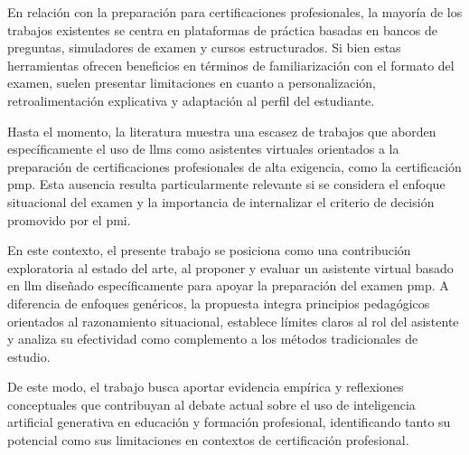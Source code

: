 En relación con la preparación para certificaciones profesionales, la mayoría de los trabajos existentes se centra en plataformas de práctica basadas en bancos de preguntas, simuladores de examen y cursos estructurados. Si bien estas herramientas ofrecen beneficios en términos de familiarización con el formato del examen, suelen presentar limitaciones en cuanto a personalización, retroalimentación explicativa y adaptación al perfil del estudiante.

Hasta el momento, la literatura muestra una escasez de trabajos que aborden específicamente el uso de \glspl{llm} como asistentes virtuales orientados a la preparación de certificaciones profesionales de alta exigencia, como la certificación \gls{pmp}. Esta ausencia resulta particularmente relevante si se considera el enfoque situacional del examen y la importancia de internalizar el criterio de decisión promovido por el \gls{pmi}.

En este contexto, el presente trabajo se posiciona como una contribución exploratoria al estado del arte, al proponer y evaluar un asistente virtual basado en \gls{llm} diseñado específicamente para apoyar la preparación del examen \gls{pmp}. A diferencia de enfoques genéricos, la propuesta integra principios pedagógicos orientados al razonamiento situacional, establece límites claros al rol del asistente y analiza su efectividad como complemento a los métodos tradicionales de estudio.

De este modo, el trabajo busca aportar evidencia empírica y reflexiones conceptuales que contribuyan al debate actual sobre el uso de inteligencia artificial generativa en educación y formación profesional, identificando tanto su potencial como sus limitaciones en contextos de certificación profesional.
